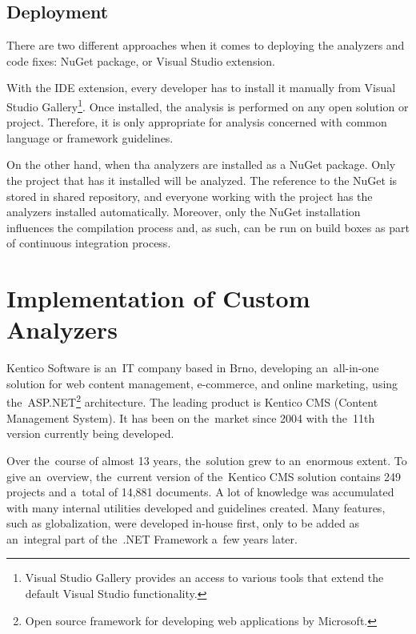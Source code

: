 \documentclass[
  digital, %
  table,   %
  lof,     %
  lot,     %
  oneside,
]{fithesis3}
\begin{document}
\section{Deployment}
There are two different approaches when it comes to deploying the analyzers and code fixes: NuGet package, or Visual Studio extension. 

With the IDE extension, every developer has to install it manually from Visual Studio Gallery\footnote{Visual Studio Gallery provides an access to various tools that extend the default Visual Studio functionality.}. Once installed, the analysis is performed on any open solution or project. Therefore, it is only appropriate for analysis concerned with common language or framework guidelines.

On the other hand, when tha analyzers are installed as a NuGet package. Only the project that has it installed will be analyzed. The reference to the NuGet is stored in shared repository, and everyone working with the project has the analyzers installed automatically. Moreover, only the NuGet installation influences the compilation process and, as such, can be run on build boxes as part of continuous integration process.



\chapter{Implementation of Custom Analyzers}
\label{chap:custom-roslyn-analyzers}
Kentico Software is an~IT company based in Brno, developing an~all-in-one solution for web content management, e-commerce, and online marketing, using the~ASP.NET\footnote{Open source framework for developing web applications by Microsoft.} architecture. The leading product is Kentico CMS (Content Management System). It has been on the~market since 2004 with the~11th version currently being developed. 

Over the~course of almost 13 years, the~solution grew to an~enormous extent. To give an~overview, the~current version of the~Kentico CMS solution contains 249   projects and a~total of 14,881 documents. A lot of knowledge was accumulated with many internal utilities developed and guidelines created. Many features, such as globalization, were developed in-house first, only to be added as an~integral part of the~.NET Framework a~few years later.
\end{document}
